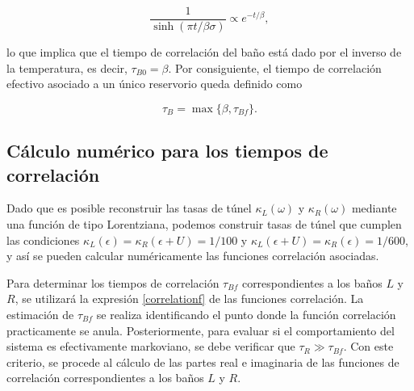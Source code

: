\begin{appendixs}
\[
\frac{1}{\sinh(\pi t/\beta \sigma)} \propto e^{-t/\beta},
\]

lo que implica que el tiempo de correlación del baño está dado por el inverso de la temperatura, es decir, $\tau_{B0} = \beta$. Por consiguiente, el tiempo de correlación efectivo asociado a un único reservorio queda definido como

\[
\tau_{B} = \max \{\beta, \tau_{Bf}\}.
\]

\label{appendix5correlation}

\subsection{Cálculo numérico para los tiempos de correlación}
Dado que es posible reconstruir las tasas de túnel $\kappa_{L}(\omega)$ y $\kappa_{R}(\omega)$ mediante una función de tipo Lorentziana, podemos construir tasas de túnel que cumplen las condiciones $\kappa_{L}(\epsilon) = \kappa_{R}(\epsilon+U) = 1/100$ y $\kappa_{L}(\epsilon+U) = \kappa_{R}(\epsilon) = 1/600$, y así se pueden calcular numéricamente las funciones correlación asociadas. 

Para determinar los tiempos de correlación $\tau_{Bf}$ correspondientes a los baños $L$ y $R$, se utilizará la expresión \ref{correlationf} de las funciones correlación. La estimación de $\tau_{Bf}$ se realiza identificando el punto donde la función correlación practicamente se anula. Posteriormente, para evaluar si el comportamiento del sistema es efectivamente markoviano, se debe verificar que $\tau_{R} \gg \tau_{Bf}$. Con este criterio, se procede al cálculo de las partes real e imaginaria de las funciones de correlación correspondientes a los baños $L$ y $R$.






\end{appendixs}
